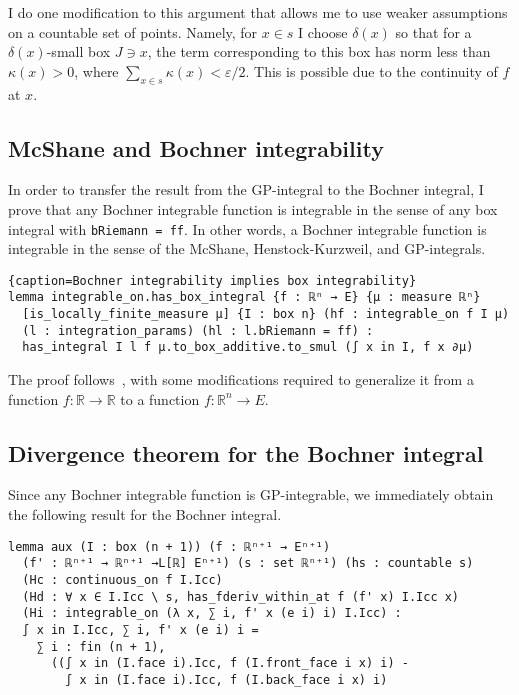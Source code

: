 \documentclass[a4paper, UKenglish,cleveref, autoref, thm-restate]{lipics-v2021}
\newcommand{\bbR}{\mathbb{R}}
\newcommand{\eps}{\varepsilon}
\begin{document}
I do one modification to this argument that allows me to use weaker
assumptions on a countable set of points. Namely, for \(x\in s\) I
choose \(\delta(x)\) so that for a \(\delta(x)\)-small box \(J\ni x\),
the term corresponding to this box has norm less than \(\kappa(x)>0\),
where \(\sum_{x\in s}\kappa(x)<\eps/2\). This is possible due to the
continuity of \(f\) at \(x\).

\subsection{McShane and Bochner integrability}%
\label{sec:mcsh-bochn-integr}

In order to transfer the result from the GP-integral to the Bochner
integral, I prove that any Bochner integrable function is integrable
in the sense of any box integral with \lstinline~bRiemann = ff~. In
other words, a Bochner integrable function is integrable in the sense
of the McShane, Henstock-Kurzweil, and GP-integrals.

\begin{lstlisting}{caption=Bochner integrability implies box integrability}
lemma integrable_on.has_box_integral {f : ℝⁿ → E} {μ : measure ℝⁿ}
  [is_locally_finite_measure μ] {I : box n} (hf : integrable_on f I μ)
  (l : integration_params) (hl : l.bRiemann = ff) :
  has_integral I l f μ.to_box_additive.to_smul (∫ x in I, f x ∂μ)
\end{lstlisting}

The proof follows~\cite{Gordon55}, with some modifications required to
generalize it from a function \(f\colon\bbR\to\bbR\) to a function
\(f\colon\bbR^{n}\to E\).

\subsection{Divergence theorem for the Bochner integral}%
\label{sec:diverg-theor-bochn}

Since any Bochner integrable function is GP-integrable, we immediately
obtain the following result for the Bochner integral.

\begin{lstlisting}
lemma aux (I : box (n + 1)) (f : ℝⁿ⁺¹ → Eⁿ⁺¹)
  (f' : ℝⁿ⁺¹ → ℝⁿ⁺¹ →L[ℝ] Eⁿ⁺¹) (s : set ℝⁿ⁺¹) (hs : countable s)
  (Hc : continuous_on f I.Icc)
  (Hd : ∀ x ∈ I.Icc \ s, has_fderiv_within_at f (f' x) I.Icc x)
  (Hi : integrable_on (λ x, ∑ i, f' x (e i) i) I.Icc) :
  ∫ x in I.Icc, ∑ i, f' x (e i) i =
    ∑ i : fin (n + 1),
      ((∫ x in (I.face i).Icc, f (I.front_face i x) i) -
        ∫ x in (I.face i).Icc, f (I.back_face i x) i)
\end{lstlisting}
\end{document}
